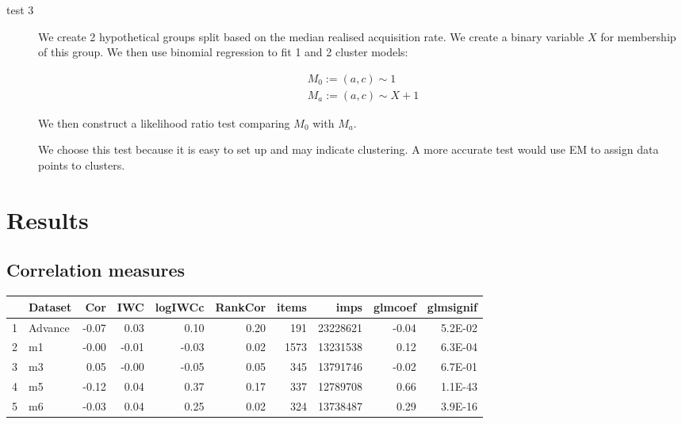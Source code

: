 \documentclass[11pt,a4,singlespacing,titlepagenumber=on]{scrreprt}
\numberwithin{equation}{chapter} %
\theoremstyle{remark}
\begin{document}
\begin{description}
	\item[test 3] We create 2 hypothetical groups split based on the median realised acquisition rate. We create a binary variable $X$ for membership of this group. We then use binomial regression to fit 1 and 2 cluster models:

\begin{align}
	M_0 := (a,c) \sim 1 \\
	M_a := (a,c) \sim X + 1
\end{align}

We then construct a likelihood ratio test comparing $M_0$ with $M_a$. 

We choose this test because it is easy to set up and may indicate clustering. A more accurate test would use EM to assign data points to clusters.
%
%
%
%
%
\end{description}

\section{Results}
\subsection{Correlation measures}


\begin{table}[ht]
\centering
\begin{tabular}{rlrrrrrrrr}
  \hline
 & Dataset & Cor & IWC & logIWCc & RankCor & items & imps & glmcoef & glmsignif \\ 
  \hline
  1 & Advance & -0.07 & 0.03 & 0.10 & 0.20 & 191 & 23228621 & -0.04 & 5.2E-02 \\ 
  2 & m1 & -0.00 & -0.01 & -0.03 & 0.02 & 1573 & 13231538 & 0.12 & 6.3E-04 \\ 
  3 & m3 & 0.05 & -0.00 & -0.05 & 0.05 & 345 & 13791746 & -0.02 & 6.7E-01 \\ 
  4 & m5 & -0.12 & 0.04 & 0.37 & 0.17 & 337 & 12789708 & 0.66 & 1.1E-43 \\ 
  5 & m6 & -0.03 & 0.04 & 0.25 & 0.02 & 324 & 13738487 & 0.29 & 3.9E-16 \\ 
   \hline
\end{tabular}
\end{table}
\end{document}

